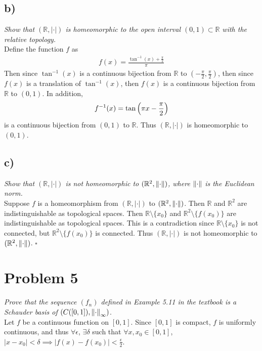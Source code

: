 \documentclass[12pt]{article}
\theoremstyle{plain}
\begin{document}
\subsection*{ b)}
\emph{Show that $(\mathbb{R}, |\cdot|)$ is homeomorphic to the open interval $(0,1) \subset \mathbb{R}$ with the relative topology.} \\

Define the function $f$ as
\begin{align*}
    f(x) = \frac{\tan^{-1}(x) + \frac{\pi}{2}}{\pi}
\end{align*}
Then since $\tan^{-1}(x)$ is a continuous bijection from $\mathbb{R}$ to $(-\frac{\pi}{2}, \frac{\pi}{2})$, then since $f(x)$ is a translation of $\tan^{-1}(x)$, then $f(x)$ is a continuous bijection from $\mathbb{R}$ to $(0,1)$.  In addition,
\begin{align*}
    f^{-1}(x) = \tan\qty(\pi x - \frac{\pi}{2})
\end{align*}
is a continuous bijection from $(0,1)$ to $\mathbb{R}$.  Thus $(\mathbb{R}, |\cdot|)$ is homeomorphic to $(0,1)$.

\subsection*{ c)}
\emph{Show that $(\mathbb{R}, |\cdot|)$ is not homeomorphic to $(\mathbb{R}^2, \norm{\cdot})$, where $\norm{\cdot}$ is the Euclidean norm.} \\

Suppose $f$ is a homeomorphism from $(\mathbb{R}, |\cdot|)$ to $(\mathbb{R}^2, \norm{\cdot})$.  Then $\mathbb{R}$ and $\mathbb{R}^2$ are indistinguishable as topological spaces.  Then $\mathbb{R}\setminus\{x_0\}$ and $\mathbb{R}^2\setminus\{f(x_0)\}$ are indistinguishable as topological spaces.  This is a contradiction since $\mathbb{R}\setminus\{x_0\}$ is not connected, but $\mathbb{R}^2\setminus\{f(x_0)\}$ is connected.  Thus $(\mathbb{R}, |\cdot|)$ is not homeomorphic to $(\mathbb{R}^2, \norm{\cdot})$. \hfill $\square$

\section*{Problem 5}
\emph{Prove that the sequence $(f_n)$ defined in Example 5.11 in the textbook is a Schauder basis of $(C([0,1]), \norm{\cdot}_\infty)$}. \\

Let $f$ be a continuous function on $[0,1]$.  Since $[0,1]$ is compact, $f$ is uniformly continuous, and thus $\forall \epsilon$, $\exists \delta$ such that $\forall x,x_0 \in [0,1]$, $|x - x_0| < \delta \implies |f(x) - f(x_0)| < \frac{\epsilon}{2}$.
\end{document}
